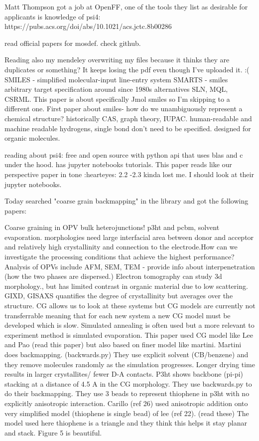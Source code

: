 \documentclass{article}
\begin{document}
Matt Thompson got a job at OpenFF, one of the tools they list as desirable for applicants is knowledge of psi4:
https://pubs.acs.org/doi/abs/10.1021/acs.jctc.8b00286

read official papers for mosdef. check github.

Reading \cite{Hanson2016} also my mendeley overwriting my files because it thinks they are duplicates or something? It keeps losing the pdf even though I've uploaded it. :(
SMILES - simplified molecular-input line-entry system
SMARTS - smiles arbitrary target specification
around since 1980s
alternatives SLN, MQL, CSRML.
This paper is about specifically Jmol smiles so I'm skipping to a different one.
\cite{Weininger1988} First paper about smiles- how do we unambiguously represent a chemical structure? historically CAS, graph theory, IUPAC.
human-readable and machine readable
hydrogens, single bond don't need to be specified. designed for organic molecules.

\cite{Smith2018} reading about psi4: free and open source with python api that uses blas and c under the hood. has jupyter notebooks tutorials. This paper reads like our perspective paper in tone :hearteyes: 2.2 -2.3 kinda lost me. I should look at their jupyter notebooks.

Today searched "coarse grain backmapping" in the library and got the following papers:
\cite{Alessandri2017b}

Coarse graining in OPV bulk heterojunctions! p3ht and pcbm, solvent evaporation. morphologies need large interfacial area between donor and acceptor and relatively high crystallinity and connection to the electrode.How can we investigate the processing conditions that achieve the highest performance?
Analysis of OPVs include AFM, SEM, TEM - provide info about interpenetration (how the two phases are dispersed.) Electron tomography can study 3d morphology., but has limited contrast in organic material due to low scattering. GIXD, GISAXS quantifies the degree of crystallinity but averages over the structure. 
CG allows us to look at these systems but CG models are currently not transferrable meaning that for each new system a new CG model must be developed which is slow. Simulated annealing is often used but a more relevant to experiment method is simulated evaporation.
This paper used CG model like Lee and Pao (read this paper) but also based on finer model like martini. Martini does backmapping. (backwards.py) 
They use explicit solvent (CB/benzene) and they remove molecules randomly as the simulation progresses. Longer drying time results in larger crystallites/ fewer D-A contacts. P3ht shows backbone (pi-pi) stacking at a distance of 4.5 A in the CG morphology. They use backwards.py to do their backmapping. They use 3 beads to represent thiophene in p3ht with no explicitly anisotropic interaction. Carillo (ref 26) used anisotropic addition onto very simplified model (thiophene is single bead) of lee (ref 22). (read these) The model used here thiophene is a triangle and they think this helps it stay planar and stack.
Figure 5 is beautiful.
\end{document}
